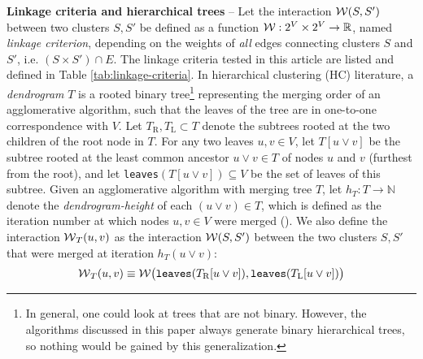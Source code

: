 \textbf{Linkage criteria and hierarchical trees} -- 
Let the interaction $\mathcal{W}(S,S')$ between two clusters $S,S'$ be defined as a function $\mathcal{W}{}:2^{V} \times 2^{V} \rightarrow \mathbb{R}$, named \emph{linkage criterion}, depending on the weights of \emph{all} edges connecting clusters $S$ and $S'$, i.e. ${(S \times S') \cap E}$. 
The linkage criteria tested in this article are listed and defined in Table \ref{tab:linkage-criteria}.
In hierarchical clustering (HC) literature,  a \emph{dendrogram} $T$ is a rooted binary tree\footnote{In general, one could look at trees that are not binary. However, the algorithms discussed in this paper always generate binary hierarchical trees, so nothing would be gained by this generalization.} representing the merging order of an agglomerative algorithm, such that the leaves of the tree are in one-to-one correspondence with $V$. 
Let $T_{\mathrm{R}},T_{\mathrm{L}}\subset T$ denote the subtrees rooted at the two children of the root node in $T$.
For any two leaves $u,v \in V$, let $T[u \vee v]$ be the subtree rooted at the least common ancestor $u \vee v\in T$ of nodes $u$ and $v$ (furthest from the root), and let \texttt{leaves}$(T[u \vee v])\subseteq V$ be the set of leaves of this subtree. 
Given an agglomerative algorithm with merging tree $T$, let $h_T:T \rightarrow \mathbb{N}$ denote the \emph{dendrogram-height} of each $(u\vee v)\in T$, which is defined as the iteration number at which nodes $u,v\in V$ were merged (). We also define the interaction $\mathcal{W}{}_{T}(u,v)$ as the interaction $\mathcal{W}{}(S,S')$ between the two clusters $S,S'$ that were merged at iteration $h_T(u\vee v)$: 
\begin{equation}\label{eq:def_dendr_interact}
\mathcal{W}{}_{T}(u,v) \equiv \mathcal{W}{} \big( \text{\texttt{leaves}}(T_{\mathrm{R}}[u \vee v]), \text{\texttt{leaves}}(T_{\mathrm{L}}[u \vee v]) \big)
\end{equation}




